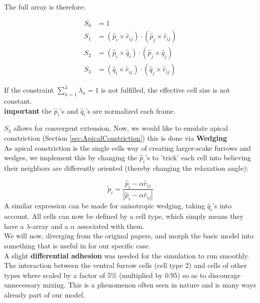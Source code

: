 The full array is therefore:

\begin{subequations}
\begin{align}
S_0&=1\label{eq:s0}\\
S_1&=\left(\hat{p}_i \times \hat{r}_{i j}\right) \cdot\left(\hat{p}_j \times \hat{r}_{i j}\right)\label{eq:s1}\\
S_2&=\left(\hat{p}_i \times \hat{q}_{i}\right) \cdot\left(\hat{p}_j \times \hat{q}_{j}\right)\label{eq:s2}\\
S_3&=\left(\hat{q}_i \times \hat{r}_{i j}\right) \cdot\left(\hat{q}_j \times \hat{r}_{i j}\right)\label{eq:s3}
\end{align}
\end{subequations}

If the constraint $\sum_{n=1}^{3}\lambda_n=1$ is not fulfilled, the effective cell size is not constant.\\

\textbf{important} the $\hat{p}_i$'s and $\hat{q}_i$'s are normalized each frame.




$S_3$ allows for convergent extension, Now, we would like to emulate apical constriction (Section \ref{sec:ApicalConstriction}) this is done via \textbf{Wedging}\\




As apical constriction is the single cells way of creating larger-scake furrows and wedges, we implement this by changing the $\hat{p}_i$'s to 'trick' each cell into believing their neighbors are differently oriented (thereby changing the relaxation angle):

\begin{equation}
    \tilde{{p}}_i = \frac{\hat{p}_i-\alpha \widehat{{r}}_{i j}}{|\hat{p}_i-\alpha \widehat{{r}}_{i j}|} 
\end{equation}
A similar expression can be made for anisotropic wedging, taking  $\hat{q}_i$'s into account. All cells can now be defined by a cell type, which simply means they have a $\lambda$-array and a $\alpha$ associated with them.\\
We will now, diverging from the original papers, and morph the basic model into something that is useful in for our specific case.\\



A slight \textbf{differential adhesion} was needed for the simulation to run smoothly. The interaction between the ventral furrow cells (cell type 2) and cells of other types where scaled by a factor of 5\% (multiplied by 0.95) so as to discourage unnecessary mixing. This is a phenomenon often seen in nature and is many ways already part of our model.\\

